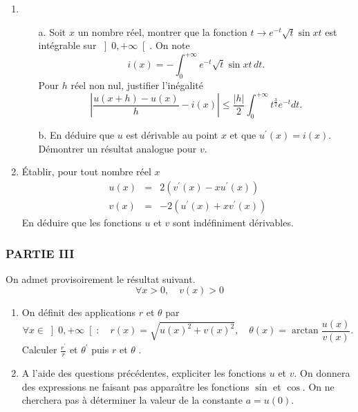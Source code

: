 \begin{enumerate}
\item
\begin{enumerate}
\item[a.]  Soit $x$ un nombre r{\'e}el, montrer que la fonction $%
t\rightarrow e^{-t}\sqrt{t}\sin xt$ est int{\'e}grable sur $\left] 0,+\infty
\right[ $. On note
\[
i(x)=-\int_{0}^{+\infty }e^{-t}\sqrt{t}\sin xt\,dt\text{.}
\]
Pour $h$ r{\'e}el non nul, justifier l'in{\'e}galit{\'e}
\[
\left| \frac{u(x+h)-u(x)}{h}-i(x)\right| \leq \frac{\left| h\right| }{2}%
\int_{0}^{+\infty }t^{\frac{3}{2}}e^{-t}dt\text{.}
\]

\item[b.]  En d{\'e}duire que $u$ est d{\'e}rivable au point $x$ et que $%
u^{\prime }(x)=i(x)$. D{\'e}montrer un r{\'e}sultat analogue pour $v$.
\end{enumerate}

\item  {\'E}tablir, pour tout nombre r{\'e}el $x$%
\begin{eqnarray*}
u(x) &=&2\left( v^{\prime }(x)-xu^{\prime }(x)\right) \\
v(x) &=&-2\left( u^{\prime }(x)+xv^{\prime }(x)\right)
\end{eqnarray*}
En d{\'e}duire que les fonctions $u$ et $v$ sont ind{\'e}finiment
d{\'e}rivables.
\end{enumerate}

\subsubsection*{PARTIE III}

On admet provisoirement le r{\'e}sultat suivant.
\begin{equation}
\forall x>0,\quad v(x)>0  \tag{R}
\end{equation}

\begin{enumerate}
\item  On d{\'e}finit des applications $r$ et $\theta $ par
\[
\forall x\in \left] 0,+\infty \right[ :\quad r(x)=\sqrt{u(x)^{2}+v(x)^{2}}%
,\quad \theta (x)=\arctan \frac{u(x)}{v(x)}\text{.}
\]
Calculer $\frac{r^{\prime }}{r}$ et $\theta ^{\prime }$ puis $r$ et $\theta $%
.

\item  A l'aide des questions pr{\'e}c{\'e}dentes, expliciter les fonctions $%
u$ et $v$. On donnera des expressions ne faisant pas appara\^{\i }tre les
fonctions $\sin $ et $\cos $. On ne cherchera pas {\`a} d{\'e}terminer la
valeur de la constante $a=u(0)$.
\end{enumerate}

